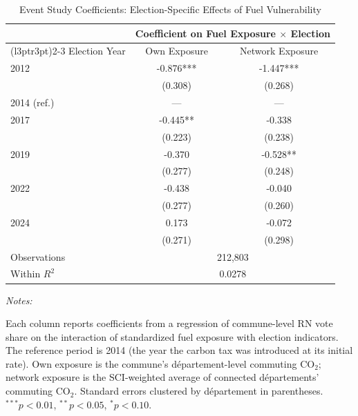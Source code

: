 \begin{table}[!h]
\centering
\caption{Event Study Coefficients: Election-Specific Effects of Fuel Vulnerability}
\centering
\fontsize{10}{12}\selectfont
\begin{threeparttable}
\begin{tabular}[t]{lcc}
\toprule
\multicolumn{1}{c}{ } & \multicolumn{2}{c}{Coefficient on Fuel Exposure $\times$ Election} \\
\cmidrule(l{3pt}r{3pt}){2-3}
Election Year & Own Exposure & Network Exposure\\
\midrule
2012 & -0.876*** & -1.447***\\
 & (0.308) & (0.268)\\
2014 (ref.) & --- & ---\\
2017 & -0.445** & -0.338\\
 & (0.223) & (0.238)\\
2019 & -0.370 & -0.528**\\
 & (0.277) & (0.248)\\
2022 & -0.438 & -0.040\\
 & (0.277) & (0.260)\\
2024 & 0.173 & -0.072\\
 & (0.271) & (0.298)\\
\midrule Observations & \multicolumn{2}{c}{212,803} \\
Within $R^2$ & \multicolumn{2}{c}{0.0278} \\
\bottomrule
\end{tabular}
\begin{tablenotes}
\item \textit{Notes:} 
\item Each column reports coefficients from a regression of commune-level RN vote share on the interaction of standardized fuel exposure with election indicators. The reference period is 2014 (the year the carbon tax was introduced at its initial rate). Own exposure is the commune's d\'{e}partement-level commuting CO$_2$; network exposure is the SCI-weighted average of connected d\'{e}partements' commuting CO$_2$. Standard errors clustered by d\'{e}partement in parentheses. $^{***}p<0.01$, $^{**}p<0.05$, $^{*}p<0.10$.
\end{tablenotes}
\end{threeparttable}
\end{table}
